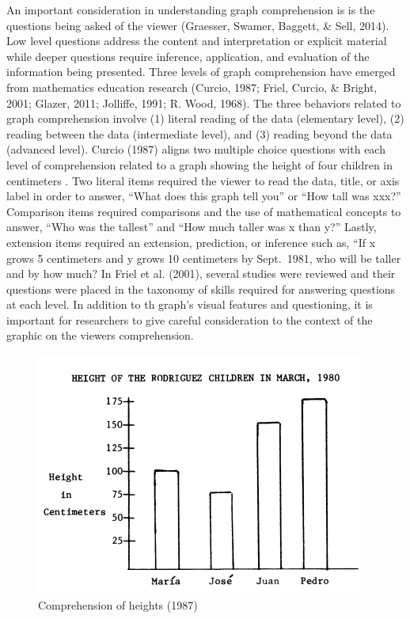 \documentclass[print]{nuthesis}
\begin{document}
An important consideration in understanding graph comprehension is is the questions being asked of the viewer (Graesser, Swamer, Baggett, \& Sell, 2014).
Low level questions address the content and interpretation or explicit material while deeper questions require inference, application, and evaluation of the information being presented.
Three levels of graph comprehension have emerged from mathematics education research (Curcio, 1987; Friel, Curcio, \& Bright, 2001; Glazer, 2011; Jolliffe, 1991; R. Wood, 1968).
The three behaviors related to graph comprehension involve (1) literal reading of the data (elementary level), (2) reading between the data (intermediate level), and (3) reading beyond the data (advanced level).
Curcio (1987) aligns two multiple choice questions with each level of comprehension related to a graph showing the height of four children in centimeters .
Two literal items required the viewer to read the data, title, or axis label in order to answer, ``What does this graph tell you'' or ``How tall was xxx?''
Comparison items required comparisons and the use of mathematical concepts to answer, ``Who was the tallest'' and ``How much taller was x than y?''
Lastly, extension items required an extension, prediction, or inference such as, ``If x grows 5 centimeters and y grows 10 centimeters by Sept.~1981, who will be taller and by how much?
In Friel et al. (2001), several studies were reviewed and their questions were placed in the taxonomy of skills required for answering questions at each level.
In addition to th graph's visual features and questioning, it is important for researchers to give careful consideration to the context of the graphic on the viewers comprehension.

\begin{figure}[tbp]

{\centering \includegraphics[width=0.8\linewidth,]{images/children-height} 

}

\caption{Comprehension of heights (1987) }\label{fig:children-height}
\end{figure}
\end{document}
